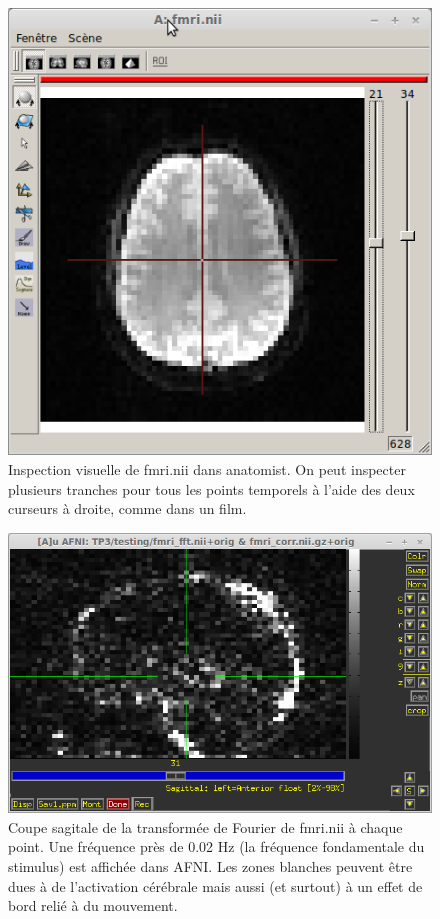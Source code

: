 \documentclass[a4paper]{article}
\begin{document}
\begin{figure}[h]
   \caption{\label{fmri_anatomist} Inspection visuelle de fmri.nii dans anatomist. On peut inspecter plusieurs tranches pour tous les points temporels à l'aide des deux curseurs à droite, comme dans un film.}
   \centering
   \includegraphics[width=\textwidth]{fmri_anatomist}
\end{figure}

\begin{figure}[h]
   \caption{\label{fmri_fft} Coupe sagitale de la transformée de Fourier de fmri.nii à chaque point. Une fréquence près de 0.02 Hz (la fréquence fondamentale du stimulus) est affichée dans AFNI. Les zones blanches peuvent être dues à de l'activation cérébrale mais aussi (et surtout) à un effet de bord relié à du mouvement.}
   \centering
   \includegraphics[width=\textwidth]{fmri_fft}
\end{figure}
\end{document}
